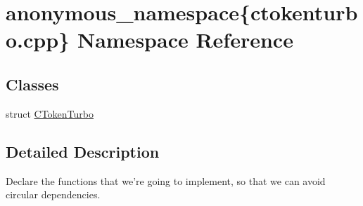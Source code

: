 \hypertarget{namespaceanonymous__namespace_02ctokenturbo_8cpp_03}{\section{anonymous\-\_\-namespace\{ctokenturbo.\-cpp\} Namespace Reference}
\label{namespaceanonymous__namespace_02ctokenturbo_8cpp_03}
}
\subsection*{Classes}
\begin{DoxyCompactItemize}
\item 
struct \hyperlink{structanonymous__namespace_02ctokenturbo_8cpp_03_1_1CTokenTurbo}{C\-Token\-Turbo}
\end{DoxyCompactItemize}


\subsection{Detailed Description}
Declare the functions that we're going to implement, so that we can avoid circular dependencies. 